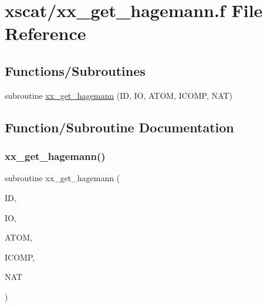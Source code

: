 \hypertarget{xx__get__hagemann_8f}{}\section{xscat/xx\+\_\+get\+\_\+hagemann.f File Reference}
\label{xx__get__hagemann_8f}
\subsection*{Functions/\+Subroutines}
\begin{DoxyCompactItemize}
\item 
subroutine \hyperlink{xx__get__hagemann_8f_a509a83915ce0fdf497ae82464778d343}{xx\+\_\+get\+\_\+hagemann} (ID, IO, A\+T\+OM, I\+C\+O\+MP, N\+AT)
\end{DoxyCompactItemize}


\subsection{Function/\+Subroutine Documentation}
\mbox{\label{xx__get__hagemann_8f_a509a83915ce0fdf497ae82464778d343}} 
\subsubsection{\texorpdfstring{xx\+\_\+get\+\_\+hagemann()}{xx\_get\_hagemann()}}
{\footnotesize\ttfamily subroutine xx\+\_\+get\+\_\+hagemann (\begin{DoxyParamCaption}\item[{integer}]{ID,  }\item[{integer}]{IO,  }\item[{character, dimension(nat)}]{A\+T\+OM,  }\item[{integer, dimension(nat)}]{I\+C\+O\+MP,  }\item[{integer}]{N\+AT }\end{DoxyParamCaption})}

